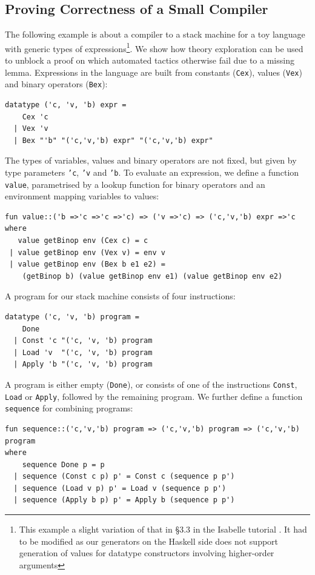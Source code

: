 \subsection{Proving Correctness of a Small Compiler}
\label{sec:comp-ex}
The following example is about a compiler to a stack machine for a toy language with generic types of expressions\footnote{This example a slight variation of that in \S3.3 in the Isabelle tutorial \cite{isabelle}. It had to be modified as our generators on the Haskell side does not support generation of values for datatype constructors involving higher-order arguments}. We show how theory exploration can be used to unblock a proof on which automated tactics otherwise fail due to a missing lemma.
Expressions in the language are built from constants (\texttt{Cex}), values (\texttt{Vex}) and binary operators (\texttt{Bex}): 
\begin{verbatim}
datatype ('c, 'v, 'b) expr =
    Cex 'c 
  | Vex 'v 
  | Bex "'b" "('c,'v,'b) expr" "('c,'v,'b) expr"
\end{verbatim}
The types of variables, values and binary operators are not fixed, but given by type parameters \texttt{'c}, \texttt{'v} and \texttt{'b}. 
To evaluate an expression, we define a function \texttt{value}, parametrised by a lookup function for binary operators and an environment mapping variables to values:
\begin{verbatim}
fun value::('b =>'c =>'c =>'c) => ('v =>'c) => ('c,'v,'b) expr =>'c
where
   value getBinop env (Cex c) = c
 | value getBinop env (Vex v) = env v
 | value getBinop env (Bex b e1 e2) = 
    (getBinop b) (value getBinop env e1) (value getBinop env e2)
\end{verbatim}
A program for our stack machine consists of four instructions:
\begin{verbatim}
datatype ('c, 'v, 'b) program =
    Done
  | Const 'c "('c, 'v, 'b) program
  | Load 'v  "('c, 'v, 'b) program
  | Apply 'b "('c, 'v, 'b) program
\end{verbatim}
A program is either empty (\texttt{Done}), or consists of one of the instructions \texttt{Const}, \texttt{Load} or \texttt{Apply}, followed by the remaining program. We further define a function \texttt{sequence} for combining programs:
\begin{verbatim}
fun sequence::('c,'v,'b) program => ('c,'v,'b) program => ('c,'v,'b) program
where
    sequence Done p = p
  | sequence (Const c p) p' = Const c (sequence p p')
  | sequence (Load v p) p' = Load v (sequence p p')
  | sequence (Apply b p) p' = Apply b (sequence p p')
\end{verbatim}

